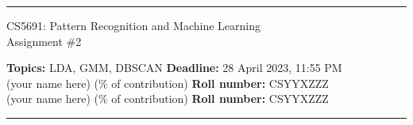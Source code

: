 \documentclass[addpoints,12pt,solution]{exam}
\begin{document}
\hrule
\vspace{1mm}
\noindent 
\begin{center}
{\Large CS5691: Pattern Recognition and Machine Learning} \\
{\large Assignment \#2}
\end{center}
\vspace{1mm}
\noindent 
\small{\textbf{Topics:} LDA, GMM, DBSCAN \hfill \textbf{Deadline:} 28 April 2023, 11:55 PM} \\


 (your name here) ($\%$ of contribution) \hfill {\bf Roll number:} CSYYXZZZ \\
 (your name here) ($\%$ of contribution)  \hfill {\bf Roll number:} CSYYXZZZ \\
\vspace{2mm}
\hrule
\end{document}

